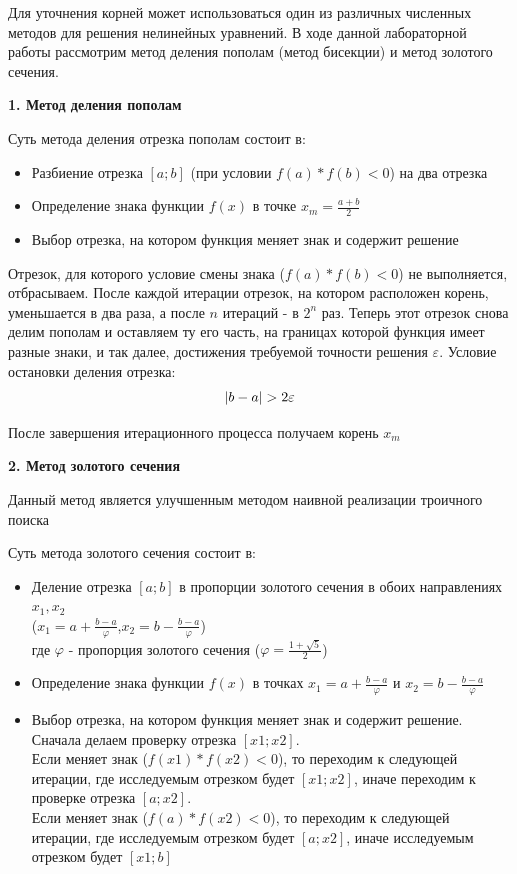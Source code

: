 \documentclass [12pt]{article}
\DeclarePairedDelimiter{\abs}{\lvert}{\rvert}
\begin{document}
Для уточнения корней может использоваться один из различных численных методов для решения нелинейных уравнений.  В ходе данной лабораторной работы рассмотрим метод деления пополам (метод бисекции) и метод золотого сечения.

\textbf{1. Метод деления пополам}

Суть метода деления отрезка пополам состоит в:
\begin{itemize}
\item Разбиение отрезка $[a;b]$ (при условии $f(a)*f(b)<0$) на два отрезка
\item Определение знака функции $f(x)$ в точке $x_m=\frac{a+b}{2}$
\item Выбор отрезка, на котором функция меняет знак и содержит решение
\end{itemize}

Отрезок, для которого условие смены знака ($f(a)*f(b)<0$) не выполняется, отбрасываем. 
После каждой итерации отрезок, на котором расположен корень, уменьшается в два раза, а после  $n$ итераций - в $2^n$ раз.
Теперь этот отрезок снова делим пополам и оставляем ту его часть, на границах которой функция имеет разные знаки, и так далее, достижения требуемой точности решения $\varepsilon$. Условие остановки деления отрезка: $$ \abs{b - a}>2\varepsilon $$

После завершения итерационного процесса получаем корень $x_m$

\textbf{2.  Метод золотого сечения}

Данный метод является улучшенным методом наивной реализации троичного поиска

Суть метода золотого сечения состоит в:
\begin{itemize}
\item Деление отрезка $[a;b]$ в пропорции золотого сечения в обоих направлениях $x_1,x_2$
\\ ($x_1=a+\frac{b-a}{\varphi}$,$x_2=b-\frac{b-a}{\varphi}$)
\\ где $\varphi$ - пропорция золотого сечения ($\varphi=\frac{1+\sqrt{5}}{2}$)
\item Определение знака функции $f(x)$ в точках $x_1=a+\frac{b-a}{\varphi}$ и $x_2=b-\frac{b-a}{\varphi}$
\item Выбор отрезка, на котором функция меняет знак и содержит решение. 
\\ Сначала делаем проверку отрезка $[x1;x2]$. 
\\ Если меняет знак ($f(x1)*f(x2)<0$), то переходим к следующей итерации, где исследуемым отрезком будет $[x1;x2]$, иначе  переходим к проверке отрезка $[a;x2]$.
\\ Если меняет знак ($f(a)*f(x2)<0$), то переходим к следующей итерации, где исследуемым отрезком будет $[a;x2]$, иначе исследуемым отрезком будет $[x1;b]$
\end{itemize}
\end{document}
